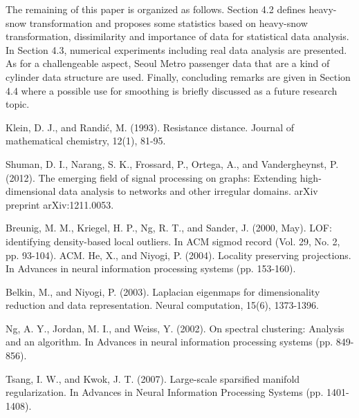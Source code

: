 \documentclass[preprint, review, 12pt]{article}
\theoremstyle{definition}
\theoremstyle{remark}
\begin{document}
The remaining of this paper is organized as follows. Section 4.2 defines heavy-snow transformation and proposes some statistics based on heavy-snow transformation, dissimilarity and importance of data for statistical data analysis. In Section 4.3, numerical experiments including real data analysis are presented. As for a challengeable aspect, Seoul Metro passenger data that are a kind of cylinder data structure are used. Finally, concluding remarks are given in Section 4.4 where a possible use for smoothing is briefly discussed as a future research topic. 
\fi 
\newpage
\begin{thebibliography}{}



Klein, D. J., and Randić, M. (1993). Resistance distance. Journal of mathematical chemistry, 12(1), 81-95.

 Shuman, D. I., Narang, S. K., Frossard, P., Ortega, A., and Vandergheynst, P. (2012). The emerging field of signal processing on graphs: Extending high-dimensional data analysis to networks and other irregular domains. arXiv preprint arXiv:1211.0053.

 Breunig, M. M., Kriegel, H. P., Ng, R. T., and Sander, J. (2000, May). LOF: identifying density-based local outliers. In ACM sigmod record (Vol. 29, No. 2, pp. 93-104). ACM.
 He, X., and Niyogi, P. (2004). Locality preserving projections. In Advances in neural information processing systems (pp. 153-160).

 Belkin, M., and Niyogi, P. (2003). Laplacian eigenmaps for dimensionality reduction and data representation. Neural computation, 15(6), 1373-1396.

 Ng, A. Y., Jordan, M. I., and Weiss, Y. (2002). On spectral clustering: Analysis and an algorithm. In Advances in neural information processing systems (pp. 849-856).

 Tsang, I. W., and Kwok, J. T. (2007). Large-scale sparsified manifold regularization. In Advances in Neural Information Processing Systems (pp. 1401-1408).



\end{thebibliography}
\end{document}
